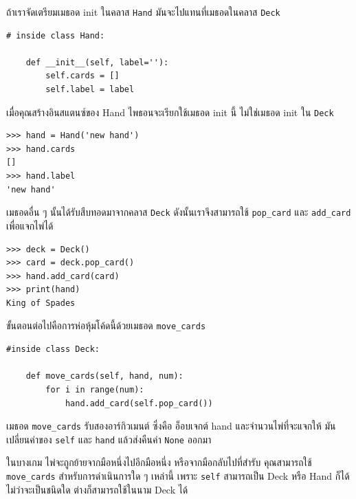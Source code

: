 ถ้าเราจัดเตรียมเมธอด init ในคลาส {\tt Hand} มันจะไปแทนที่เมธอดในคลาส {\tt Deck}

\begin{verbatim}
# inside class Hand:

    def __init__(self, label=''):
        self.cards = []
        self.label = label
\end{verbatim}
%
เมื่อคุณสร้างอินสแตนซ์ของ Hand ไพธอนจะเรียกใช้เมธอด init นี้ ไม่ใช่เมธอด init ใน {\tt Deck}

\begin{verbatim}
>>> hand = Hand('new hand')
>>> hand.cards
[]
>>> hand.label
'new hand'
\end{verbatim}
%
เมธอดอื่น ๆ นั้นได้รับสืบทอดมาจากคลาส {\tt Deck} ดังนั้นเราจึงสามารถใช้ \verb"pop_card" และ \verb"add_card" เพื่อแจกไพ่ได้

\begin{verbatim}
>>> deck = Deck()
>>> card = deck.pop_card()
>>> hand.add_card(card)
>>> print(hand)
King of Spades
\end{verbatim}
%
ขั้นตอนต่อไปคือการห่อหุ้มโค้ดนี้ด้วยเมธอด \verb"move_cards"

\begin{verbatim}
#inside class Deck:

    def move_cards(self, hand, num):
        for i in range(num):
            hand.add_card(self.pop_card())
\end{verbatim}
%

เมธอด \verb"move_cards" รับสองอาร์กิวเมนต์
ซึ่งคือ อ็อบเจกต์ hand และจำนวนไพ่ที่จะแจกให้ 
มันเปลี่ยนค่าของ {\tt self} และ {\tt hand} แล้วส่งคืนค่า {\tt None} ออกมา



ในบางเกม ไพ่จะถูกย้ายจากมือหนึ่งไปอีกมือหนึ่ง หรือจากมือกลับไปที่สำรับ คุณสามารถใช้ \verb"move_cards" 
สำหรับการดำเนินการใด ๆ เหล่านี้ เพราะ {\tt self} สามารถเป็น Deck หรือ Hand ก็ได้  ไม่ว่าจะเป็นชนิดใด ต่างก็สามารถใช้ในนาม Deck ได้


